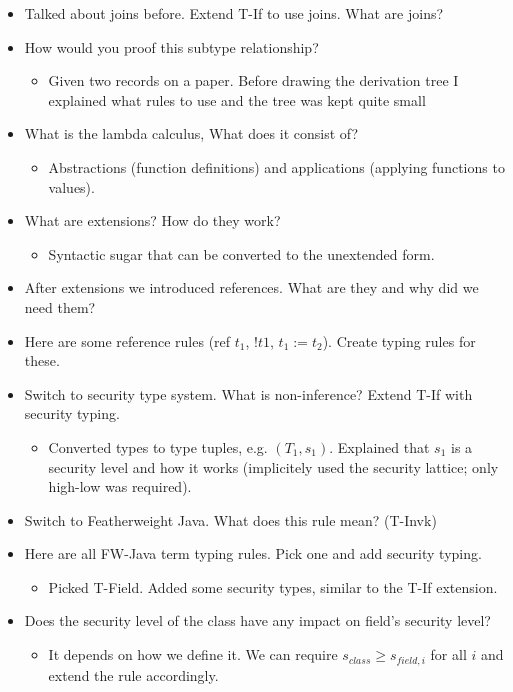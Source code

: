 \documentclass[11pt, a4paper]{article}
\begin{document}
\begin{itemize}
\item Talked about joins before. Extend T-If to use joins. What are joins?
\item How would you proof this subtype relationship?
\begin{itemize}
   \item Given two records on a paper. Before drawing the  derivation tree I explained what rules to use and the tree was kept quite small
\end{itemize}
\item What is the lambda calculus, What does it consist of?
\begin{itemize}
   \item Abstractions (function definitions) and applications (applying functions to values).
\end{itemize}
\item What are extensions? How do they work?
\begin{itemize}
   \item Syntactic sugar that can be converted to the unextended form. 
\end{itemize}
\item After extensions we introduced references. What are they and why did we need them? 
\item Here are some reference rules (ref $t_1$, $!t1$, $t_1 := t_2$). Create typing rules for these.
\item Switch to security type system. What is non-inference? Extend T-If with security typing.
\begin{itemize}
   \item Converted types to type tuples, e.g. $(T_1, s_1)$. Explained that $s_1$ is a security level and how it works (implicitely used the security lattice; only high-low was required).
\end{itemize}
\item Switch to Featherweight Java. What does this rule mean? (T-Invk)
\item Here are all FW-Java term typing rules. Pick one and add security typing.
\begin{itemize}
   \item Picked T-Field. Added some security types, similar to the T-If extension.
\end{itemize}
\item Does the security level of the class have any impact on field's security level?
\begin{itemize}
   \item It depends on how we define it. We can require $s_{class} \geq s_{field, i}$ for all $i$ and extend the rule accordingly.

\end{itemize}
\end{itemize}
\end{document}
